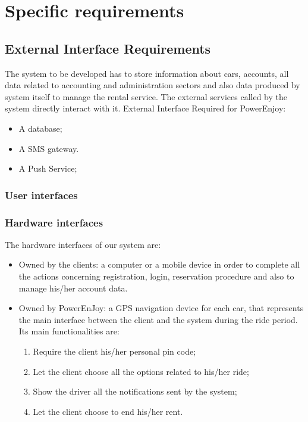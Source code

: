 \chapter{Specific requirements}

\section{External Interface Requirements }
The system to be developed has to store information about cars, accounts, all data related to accounting and administration sectors and also data produced by system itself to manage the rental service. The external services called by the system directly interact with it.
External Interface Required for PowerEnjoy:
\begin{itemize}
\item A database;
\item A SMS gateway.
\item A Push Service;
\end{itemize}

\subsection{User interfaces}

\subsection{Hardware interfaces}
The hardware interfaces of our system are:
\begin{itemize}
\item Owned by the clients: a computer or a mobile device in order to complete all the actions concerning registration, login, reservation procedure and also to manage his/her account data.
\item Owned by PowerEnJoy: a GPS navigation device for each car, that represents the main interface between the client and the system during the ride period.
Its main functionalities are:
\begin{enumerate}
\item Require the client his/her personal pin code;
\item Let the client choose all the options related to his/her ride;
\item Show the driver all the notifications sent by the system;
\item Let the client choose to end his/her rent.
\end{enumerate}
\end{itemize}
